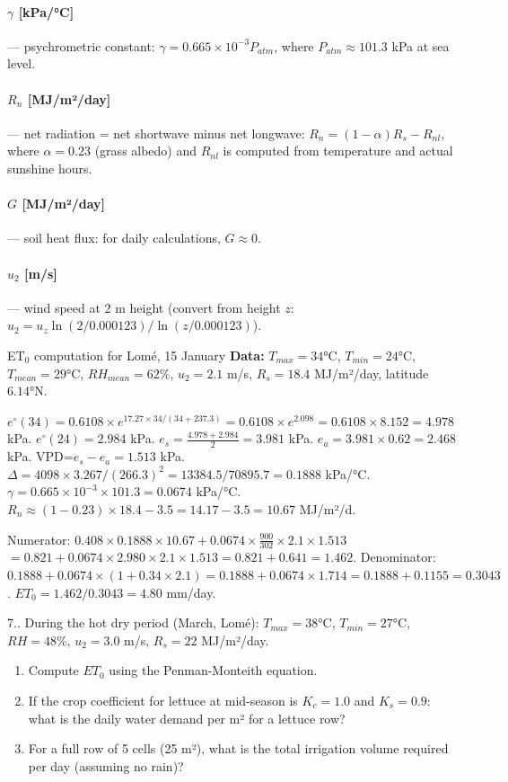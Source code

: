 \documentclass[12pt,a4paper,openany]{book}
\newcounter{exoctr}[chapter]
\renewcommand{\theexoctr}{\thechapter.\arabic{exoctr}}
\begin{document}
\paragraph{$\gamma$ [kPa/°C]} — psychrometric constant: $\gamma=0.665\times10^{-3}P_{atm}$, where $P_{atm}\approx101.3$ kPa at sea level.

\paragraph{$R_n$ [MJ/m²/day]} — net radiation = net shortwave minus net longwave:
$R_n = (1-\alpha)R_s - R_{nl}$, where $\alpha=0.23$ (grass albedo) and $R_{nl}$ is computed from temperature and actual sunshine hours.

\paragraph{$G$ [MJ/m²/day]} — soil heat flux: for daily calculations, $G\approx0$.

\paragraph{$u_2$ [m/s]} — wind speed at 2 m height (convert from height $z$: $u_2=u_z\ln(2/0.000123)/\ln(z/0.000123)$).

\begin{exbox}{ET$_0$ computation for Lomé, 15 January}
\textbf{Data:} $T_{max}=34$°C, $T_{min}=24$°C, $T_{mean}=29$°C, $RH_{mean}=62\%$, $u_2=2.1$ m/s, $R_s=18.4$ MJ/m²/day, latitude $6.14°$N.

$e^{\circ}(34)=0.6108\times e^{17.27\times34/(34+237.3)}=0.6108\times e^{2.098}=0.6108\times8.152=4.978$ kPa.
$e^{\circ}(24)=2.984$ kPa. $e_s=\frac{4.978+2.984}{2}=3.981$ kPa.
$e_a=3.981\times0.62=2.468$ kPa. VPD=$e_s-e_a=1.513$ kPa.
$\Delta=4098\times 3.267/(266.3)^2=13384.5/70895.7=0.1888$ kPa/°C.
$\gamma=0.665\times10^{-3}\times101.3=0.0674$ kPa/°C.
$R_n\approx(1-0.23)\times18.4-3.5=14.17-3.5=10.67$ MJ/m²/d.

Numerator: $0.408\times0.1888\times10.67+0.0674\times\frac{900}{302}\times2.1\times1.513$
$=0.821+0.0674\times2.980\times2.1\times1.513=0.821+0.641=1.462$.
Denominator: $0.1888+0.0674\times(1+0.34\times2.1)=0.1888+0.0674\times1.714=0.1888+0.1155=0.3043$.
$ET_0=1.462/0.3043=\mathbf{4.80}$ mm/day.
\end{exbox}

\begin{exobox}{7.\theexoctr}
During the hot dry period (March, Lomé): $T_{max}=38$°C, $T_{min}=27°$C, $RH=48\%$, $u_2=3.0$ m/s, $R_s=22$ MJ/m²/day.
\begin{enumerate}[label=(\alph*)]
  \item Compute $ET_0$ using the Penman-Monteith equation.
  \item If the crop coefficient for lettuce at mid-season is $K_c=1.0$ and $K_s=0.9$: what is the daily water demand per m² for a lettuce row?
  \item For a full row of 5 cells (25 m²), what is the total irrigation volume required per day (assuming no rain)?
\end{enumerate}
\end{exobox}
\end{document}
